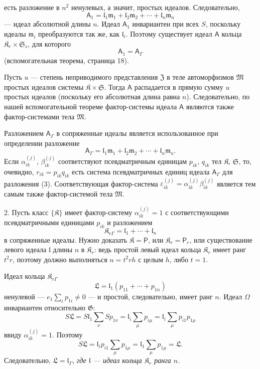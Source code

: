 \documentclass[11pt]{article}
\begin{document}
есть разложение в \(n^2\) ненулевых, а значит, простых идеалов. Следовательно,
\[
\mathsf{A}_1=\mathfrak l_1\mathfrak m_1+\mathfrak l_2\mathfrak m_2+\cdots+\mathfrak l_n\mathfrak m_n
\]
--- идеал абсолютной длины \(n\). Идеал \(\mathsf{A}_1\) инвариантен при всех \(S\), поскольку идеалы \(\mathfrak m_i\) преобразуются так же, как \(\mathfrak l_i\). Поэтому существует идеал \(\mathsf{A}\) кольца \(\mathfrak K_r\times\mathfrak S_s\), для которого
\[
\mathsf{A}_1=\mathsf{A}_\Gamma
\]
(вспомогательная теорема, страница 18).

Пусть \(u\) --- степень неприводимого представления \(\mathfrak Z\) в теле автоморфизмов \(\mathfrak M\) простых идеалов системы \(\mathfrak K\times\mathfrak S\). Тогда \(\mathsf{A}\) распадается в прямую сумму \(u\) простых идеалов (поскольку его абсолютная длина равна \(n\)). Следовательно, по нашей вспомогательной теореме фактор-системы идеала \(\mathsf{A}\) являются также фактор-системами тела \(\mathfrak M\).

Разложением \(\mathsf{A}_\Gamma\) в сопряженные идеалы является использованное при определении разложение
\[
\tag{3}
\mathsf{A}_\Gamma=\mathfrak l_1\mathfrak m_1+\mathfrak l_2\mathfrak m_2+\cdots+\mathfrak l_n\mathfrak m_n.
\]
Если \(\alpha_{ik}^{(j)}\), \(\beta_{ik}^{(j)}\) соответствуют псевдматричным единицам \(p_{ik}\), \(q_{ik}\) тел \(\mathfrak K\), \(\mathfrak S\), то, очевидно, \(r_{ik}=p_{ik}q_{ik}\) есть система псевдматричных единиц идеала \(\mathsf{A}_\Gamma\) для разложения (3). Соответствующая фактор-система \(\varepsilon_{ik}^{(j)}=\alpha_{ik}^{(j)}\beta_{ik}^{(j)}\) является тем самым также фактор-системой тела \(\mathfrak M\).

2. Пусть класс \(\{\mathfrak K\}\) имеет фактор-систему \(\alpha_{ik}^{(j)}=1\) с соответствующими псевдматричными единицами \(p_{ik}\) и разложением
\[
\mathfrak K_{r\Gamma}=\mathfrak l_1+\cdots+\mathfrak l_n
\]
в сопряженные идеалы. Нужно доказать \(\mathfrak K=\mathsf P\), или \(\mathfrak K_r=\mathsf P_r\), или существование левого идеала \(\mathfrak l\) длины \(n\) в \(\mathfrak K_r\): ведь простой левый идеал кольца \(\mathfrak K_r\) имеет ранг \(t^2r\), поэтому должно выполняться \(n=t^2rh\) с целым \(h\), либо \(t=1\).

Идеал кольца \(\mathfrak K_{r\Gamma}\)
\[
\mathfrak L=\mathfrak l_1(p_{11}+\cdots+p_{1n})
\]
ненулевой --- \(e_1\sum_i p_{1i}\ne0\) --- и простой, следовательно, имеет ранг \(n\). Идеал \(\Omega\) инвариантен относительно \(\mathfrak G\):
\[
S\mathfrak L
=S\mathfrak l_1\sum_\nu S p_{1\nu}
=\mathfrak l_i\sum_\mu p_{i\mu}
=\mathfrak l_i\sum_\mu p_{i1}p_{1\mu}
\]
ввиду \(\alpha_{ik}^{(j)}=1\). Поэтому
\[
S\mathfrak L=\mathfrak l_ip_{i1}\sum_\mu p_{1\mu}
=\mathfrak l_1\sum_\mu p_{1\mu}
=\mathfrak L.
\]
Следовательно, \(\mathfrak L=\mathfrak l_\Gamma\), \emph{где \(\mathfrak l\) --- идеал кольца \(\mathfrak K_r\) ранга \(n\).}
\end{document}
